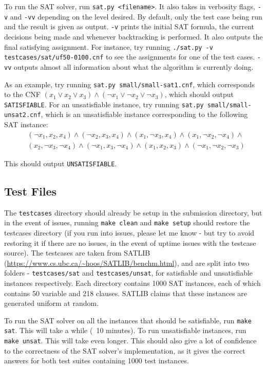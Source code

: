 \documentclass[11pt]{article}
\begin{document}
To run the SAT solver, run \texttt{sat.py <filename>}. It also takes in verbosity flags, \texttt{-v} and \texttt{-vv} depending on the level desired. By default, only the test case being run and the result is given as output. \texttt{-v} prints the initial SAT formula, the current decisions being made and whenever backtracking is performed. It also outputs the final satisfying assignment. For instance, try running \texttt{./sat.py -v testcases/sat/uf50-0100.cnf} to see the assignments for one of the test cases. \texttt{-vv} outputs almost all information about what the algorithm is currently doing.

As an example, try running \texttt{sat.py small/small-sat1.cnf}, which corresponds to the CNF $(x_1 \vee x_2 \vee x_3) \wedge (\neg x_1 \vee \neg x_2 \vee \neg x_3)$, which should output \texttt{SATISFIABLE}. For an unsatisfiable instance, try running \texttt{sat.py small/small-unsat2.cnf}, which is an unsatisfiable instance corresponding to the following SAT instance:
\begin{align*}
& (\neg x_1,  x_2,  x_4) \wedge
(\neg x_2,  x_3,  x_4) \wedge
( x_1, \neg x_3,   x_4)  \wedge
( x_1, \neg x_2, \neg x_4)  \wedge \\
& ( x_2, \neg x_3, \neg x_4)  \wedge
(\neg x_1,   x_3, \neg x_4)  \wedge
(  x_1,  x_2,   x_3)  \wedge
(\neg x_1, \neg x_2, \neg x_3)  
\end{align*}

This should output \texttt{UNSATISFIABLE}.

\subsection{Test Files}

The \texttt{testcases} directory should already be setup in the submission directory, but in the event of issues, running \texttt{make clean} and \texttt{make setup} should restore the testcases directory (if you run into issues, please let me know - but try to avoid restoring it if there are no issues, in the event of uptime issues with the testcase source). The testcases are taken from SATLIB (\url{https://www.cs.ubc.ca/~hoos/SATLIB/benchm.html}), and are split into two folders - \texttt{testcases/sat} and \texttt{testcases/unsat}, for satisfiable and unsatisfiable instances respectively. Each directory contains 1000 SAT instances, each of which contains 50 variable and 218 clauses. SATLIB claims that these instances are generated uniform at random.

To run the SAT solver on all the instances that should be satisfiable, run \texttt{make sat}. This will take a while (~10 minutes). To run unsatisfiable instances, run \texttt{make unsat}. This will take even longer. This should also give a lot of confidence to the correctness of the SAT solver's implementation, as it gives the correct answers for both test suites containing 1000 test instances.
\end{document}
